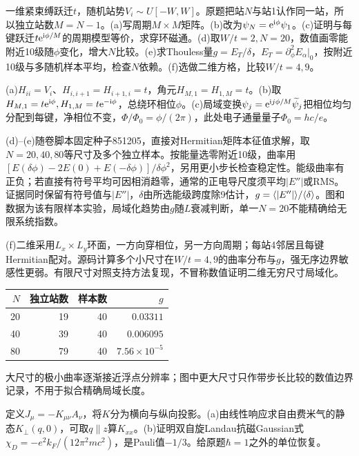 \begin{exercise}[原题1(a)--(f)，(f)选做]\label{p:512-5-1}
一维紧束缚跃迁$t$，随机站势$V_i\sim U[-W,W]$。原题把站$N$与站1认作同一站，所以独立站数$M=N-1$。(a)写周期$M\times M$矩阵。(b)改为$\psi_N=\mathrm e^{\mathrm i\phi}\psi_1$。(c)证明与每键跃迁$t\mathrm e^{\mathrm i\phi/M}$的周期模型等价，求穿环磁通。(d)取$W/t=2,N=20$，数值画零能附近10级随$\phi$变化，增大$N$比较。(e)求Thouless量$g=E_T/\delta$，$E_T=\partial_\phi^2E_\alpha|_0$，按附近10级与多随机样本平均，检查$N$依赖。(f)选做二维方格，比较$W/t=4,9$。
\end{exercise}
\begin{solution}
(a)$H_{ii}=V_i$、$H_{i,i+1}=H_{i+1,i}=t$，角元$H_{M,1}=H_{1,M}=t$。(b)取$H_{M,1}=t\mathrm e^{\mathrm i\phi},H_{1,M}=t\mathrm e^{-\mathrm i\phi}$，总绕环相位$\phi$。(c)局域变换$\psi_j=\mathrm e^{\mathrm i j\phi/M}\widetilde\psi_j$把相位均匀分配到每键，净相位不变，$\Phi/\Phi_0=\phi/(2\pi)$，此处电子通量量子$\Phi_0=hc/e$。

(d)--(e)随卷脚本固定种子851205，直接对Hermitian矩阵本征值求解，取$N=20,40,80$等尺寸及多个独立样本。按能量选零附近10级，曲率用$[E(\delta\phi)-2E(0)+E(-\delta\phi)]/\delta\phi^2$，另用更小步长检查稳定性。能级曲率有正负；若直接有符号平均可因相消趋零，通常的正电导尺度须平均$|E''|$或RMS。证据同时保留有符号值与$|E''|$，$\delta$由所选能级跨度除9估计，$g=\langle |E''|\rangle/\langle \delta\rangle$。图和数据为该有限样本实验，局域化趋势由$g$随$L$衰减判断，单一$N=20$不能精确给无限系统指数。

(f)二维采用$L_x\times L_y$环面，一方向穿相位，另一方向周期；每站4邻居且每键Hermitian配对。源码计算多个小尺寸在$W/t=4,9$的曲率分布与$g$，强无序边界敏感性更弱。有限尺寸对照支持方法复现，不冒称数值证明二维无穷尺寸局域化。
\end{solution}


\begin{center}\begin{tabular}{rrrr}\toprule $N$&独立站数&样本数&$g$\\\midrule
20&19&40&$0.03311$\\
40&39&40&$0.006095$\\
80&79&40&$7.56\times10^{-5}$\\\bottomrule\end{tabular}\end{center}
大尺寸的极小曲率逐渐接近浮点分辨率；图中更大尺寸只作带步长比较的数值边界记录，不用于拟合精确局域长度。

\begin{exercise}[原题1(a)--(b)]\label{p:512-6-1}
定义$J_\mu=-K_{\mu\nu}A_\nu$，将$K$分为横向与纵向投影。(a)由线性响应求自由费米气的静态$K_\perp(q,0)$，可取$q\parallel z$算$K_{xx}$。(b)证明双自旋Landau抗磁Gaussian式$\chi_D=-e^2k_F/(12\pi^2mc^2)$，是Pauli值$-1/3$。给原题$\hbar=1$之外的单位恢复。
\end{exercise}
